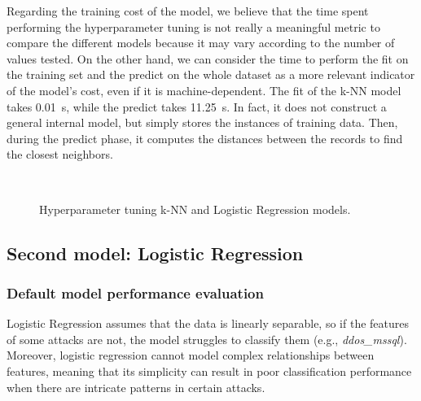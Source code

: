 \documentclass[acmlarge,nonacm]{acmart}
\begin{document}
Regarding the training cost of the model, we believe that the time spent performing the hyperparameter tuning is not really a meaningful metric to compare the different models because it may vary according to the number of values tested. On the other hand, we can consider the time to perform the fit on the training set and the predict on the whole dataset as a more relevant indicator of the model's cost, even if it is machine-dependent. The fit of the k-NN model takes \SI{0.01}{\second}, while the predict takes \SI{11.25}{\second}. In fact, it does not construct a general internal model, but simply stores the instances of training data. Then, during the predict phase, it computes the distances between the records to find the closest neighbors.

\begin{figure}
	\centering
     \quad
	 \\
  	\caption{Hyperparameter tuning k-NN and Logistic Regression models.} 
\end{figure}

\subsection{Second model: Logistic Regression}
\subsubsection{Default model performance evaluation} 
Logistic Regression assumes that the data is linearly separable, so if the features of some attacks are not, the model struggles to classify them (e.g., \emph{ddos\_mssql}). Moreover, logistic regression cannot model complex relationships between features, meaning that its simplicity can result in poor classification performance when there are intricate patterns in certain attacks.
\end{document}
